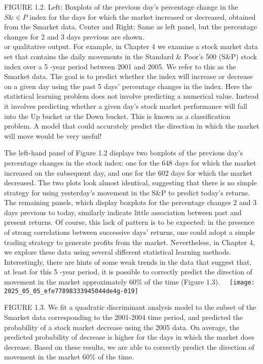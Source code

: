 \documentclass[10pt]{article}
\begin{document}
FIGURE 1.2. Left: Boxplots of the previous day's percentage change in the $S \& \in P$ index for the days for which the market increased or decreased, obtained from the Smarket data. Center and Right: Same as left panel, but the percentage changes for 2 and 3 days previous are shown.\\
or qualitative output. For example, in Chapter 4 we examine a stock market data set that contains the daily movements in the Standard \& Poor's 500 (S\&P) stock index over a 5 -year period between 2001 and 2005. We refer to this as the Smarket data. The goal is to predict whether the index will increase or decrease on a given day using the past 5 days' percentage changes in the index. Here the statistical learning problem does not involve predicting a numerical value. Instead it involves predicting whether a given day's stock market performance will fall into the Up bucket or the Down bucket. This is known as a classification problem. A model that could accurately predict the direction in which the market will move would be very useful!

The left-hand panel of Figure 1.2 displays two boxplots of the previous day's percentage changes in the stock index: one for the 648 days for which the market increased on the subsequent day, and one for the 602 days for which the market decreased. The two plots look almost identical, suggesting that there is no simple strategy for using yesterday's movement in the S\&P to predict today's returns. The remaining panels, which display boxplots for the percentage changes 2 and 3 days previous to today, similarly indicate little association between past and present returns. Of course, this lack of pattern is to be expected: in the presence of strong correlations between successive days' returns, one could adopt a simple trading strategy to generate profits from the market. Nevertheless, in Chapter 4, we explore these data using several different statistical learning methods. Interestingly, there are hints of some weak trends in the data that suggest that, at least for this 5 -year period, it is possible to correctly predict the direction of movement in the market approximately $60 \%$ of the time (Figure 1.3).\
\
\texttt{[image: 2025\_05\_05\_efe77898333945044de4g-019]}

FIGURE 1.3. We fit a quadratic discriminant analysis model to the subset of the Smarket data corresponding to the 2001-2004 time period, and predicted the probability of a stock market decrease using the 2005 data. On average, the predicted probability of decrease is higher for the days in which the market does decrease. Based on these results, we are able to correctly predict the direction of movement in the market $60 \%$ of the time.
\end{document}
